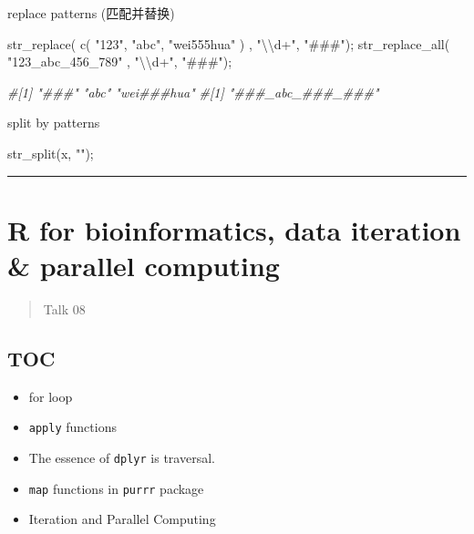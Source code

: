\documentclass[
]{article}
\newenvironment{Shaded}{}{}
\newcommand{\CommentTok}[1]{\textcolor[rgb]{0.38,0.63,0.69}{\textit{#1}}}
\newcommand{\FunctionTok}[1]{\textcolor[rgb]{0.02,0.16,0.49}{#1}}
\newcommand{\NormalTok}[1]{#1}
\newcommand{\SpecialCharTok}[1]{\textcolor[rgb]{0.25,0.44,0.63}{#1}}
\newcommand{\StringTok}[1]{\textcolor[rgb]{0.25,0.44,0.63}{#1}}
\begin{document}
\begin{enumerate}
  replace patterns (匹配并替换)

\begin{Shaded}
\begin{Highlighting}[]
\FunctionTok{str\_replace}\NormalTok{( }\FunctionTok{c}\NormalTok{( }\StringTok{"123"}\NormalTok{, }\StringTok{"abc"}\NormalTok{, }\StringTok{"wei555hua"}\NormalTok{ ) , }\StringTok{"}\SpecialCharTok{\textbackslash{}\textbackslash{}}\StringTok{d+"}\NormalTok{, }\StringTok{"\#\#\#"}\NormalTok{);}
\FunctionTok{str\_replace\_all}\NormalTok{( }\StringTok{"123\_abc\_456\_789"}\NormalTok{ , }\StringTok{"}\SpecialCharTok{\textbackslash{}\textbackslash{}}\StringTok{d+"}\NormalTok{, }\StringTok{"\#\#\#"}\NormalTok{);}

\CommentTok{\#[1] "\#\#\#"       "abc"       "wei\#\#\#hua"}
\CommentTok{\#[1] "\#\#\#\_abc\_\#\#\#\_\#\#\#"}
\end{Highlighting}
\end{Shaded}

  split by patterns

\begin{Shaded}
\begin{Highlighting}[]
\FunctionTok{str\_split}\NormalTok{(x, }\StringTok{""}\NormalTok{);}
\end{Highlighting}
\end{Shaded}
\end{enumerate}

\begin{center}\rule{0.5\linewidth}{0.5pt}\end{center}

\newpage
\hypertarget{r-for-bioinformatics-data-iteration--parallel-computing}{%
\section{R for bioinformatics, data iteration \& parallel
computing}\label{r-for-bioinformatics-data-iteration--parallel-computing}}

\begin{quote}
Talk 08
\end{quote}

\hypertarget{toc}{%
\subsection{TOC}\label{toc}}

\begin{itemize}
\item
  for loop
\item
  \texttt{apply} functions
\item
  The essence of \texttt{dplyr} is traversal.
\item
  \texttt{map} functions in \texttt{purrr} package
\item
  Iteration and Parallel Computing
\end{itemize}
\end{document}

